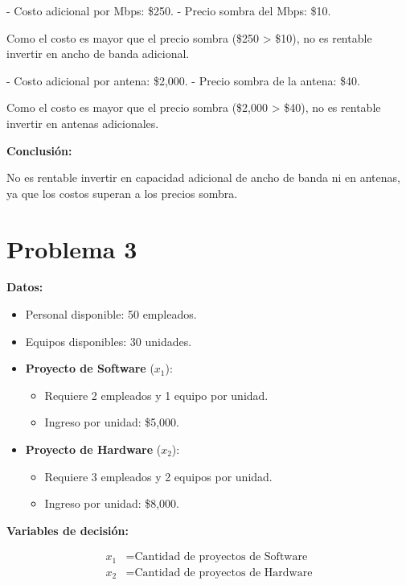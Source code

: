 \documentclass{article}
\begin{document}
- Costo adicional por Mbps: \$250.
- Precio sombra del Mbps: \$10.

Como el costo es mayor que el precio sombra (\$250 > \$10), no es rentable invertir en ancho de banda adicional.

- Costo adicional por antena: \$2,000.
- Precio sombra de la antena: \$40.

Como el costo es mayor que el precio sombra (\$2,000 > \$40), no es rentable invertir en antenas adicionales.

\textbf{Conclusión:}

No es rentable invertir en capacidad adicional de ancho de banda ni en antenas, ya que los costos superan a los precios sombra.

\newpage

\section*{Problema 3}

\begin{multicols}{2}
    
\textbf{Datos:}

\begin{itemize}
    \item Personal disponible: 50 empleados.
    \item Equipos disponibles: 30 unidades.
    \item \textbf{Proyecto de Software} (\( x_1 \)):
    \begin{itemize}
        \item Requiere 2 empleados y 1 equipo por unidad.
        \item Ingreso por unidad: \$5,000.
    \end{itemize}
    \item \textbf{Proyecto de Hardware} (\( x_2 \)):
    \begin{itemize}
        \item Requiere 3 empleados y 2 equipos por unidad.
        \item Ingreso por unidad: \$8,000.
    \end{itemize}
\end{itemize}

\textbf{Variables de decisión:}

\[
\begin{aligned}
x_1 &= \text{Cantidad de proyectos de Software} \\
x_2 &= \text{Cantidad de proyectos de Hardware}
\end{aligned}
\]
\end{multicols}
\end{document}
